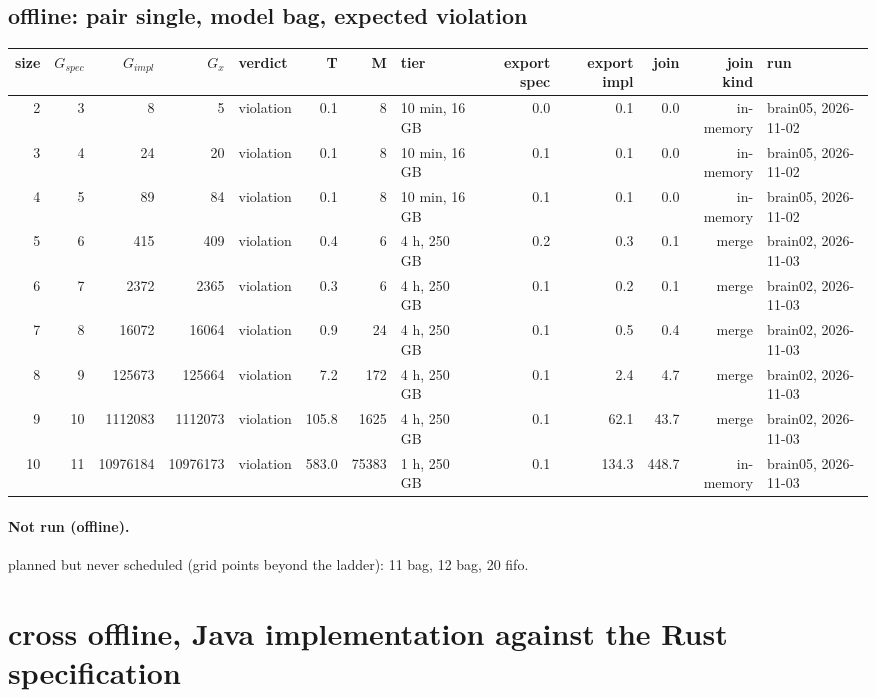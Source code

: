 \documentclass[10pt]{article}
\begin{document}
\subsection*{offline: pair \textsf{single}, model bag, expected violation}
\begin{longtable}{@{}rrrrlrrlrrrrl@{}}
\toprule
size & $G_{\mathit{spec}}$ & $G_{\mathit{impl}}$ & $G_x$ & verdict & T & M & tier & export spec & export impl & join & join kind & run \\
\midrule
\endhead
\color{red} 2 & 3 & 8 & 5 & violation & 0.1 & 8 & 10 min, 16 GB & 0.0 & 0.1 & 0.0 & in-memory & brain05, 2026-11-02 \\
\color{red} 3 & 4 & 24 & 20 & violation & 0.1 & 8 & 10 min, 16 GB & 0.1 & 0.1 & 0.0 & in-memory & brain05, 2026-11-02 \\
\color{red} 4 & 5 & 89 & 84 & violation & 0.1 & 8 & 10 min, 16 GB & 0.1 & 0.1 & 0.0 & in-memory & brain05, 2026-11-02 \\
\color{blue} 5 & 6 & 415 & 409 & violation & 0.4 & 6 & 4 h, 250 GB & 0.2 & 0.3 & 0.1 & merge & brain02, 2026-11-03 \\
\color{blue} 6 & 7 & 2372 & 2365 & violation & 0.3 & 6 & 4 h, 250 GB & 0.1 & 0.2 & 0.1 & merge & brain02, 2026-11-03 \\
\color{blue} 7 & 8 & 16072 & 16064 & violation & 0.9 & 24 & 4 h, 250 GB & 0.1 & 0.5 & 0.4 & merge & brain02, 2026-11-03 \\
\color{blue} 8 & 9 & 125673 & 125664 & violation & 7.2 & 172 & 4 h, 250 GB & 0.1 & 2.4 & 4.7 & merge & brain02, 2026-11-03 \\
\color{blue} 9 & 10 & 1112083 & 1112073 & violation & 105.8 & 1625 & 4 h, 250 GB & 0.1 & 62.1 & 43.7 & merge & brain02, 2026-11-03 \\
\color{red} 10 & 11 & 10976184 & 10976173 & violation & 583.0 & 75383 & 1 h, 250 GB & 0.1 & 134.3 & 448.7 & in-memory & brain05, 2026-11-03 \\
\bottomrule
\end{longtable}
\paragraph{Not run (offline).}
planned but never scheduled (grid points beyond the ladder): 11 bag, 12 bag, 20 fifo.\par
\section*{cross offline, Java implementation against the Rust specification}
\end{document}
